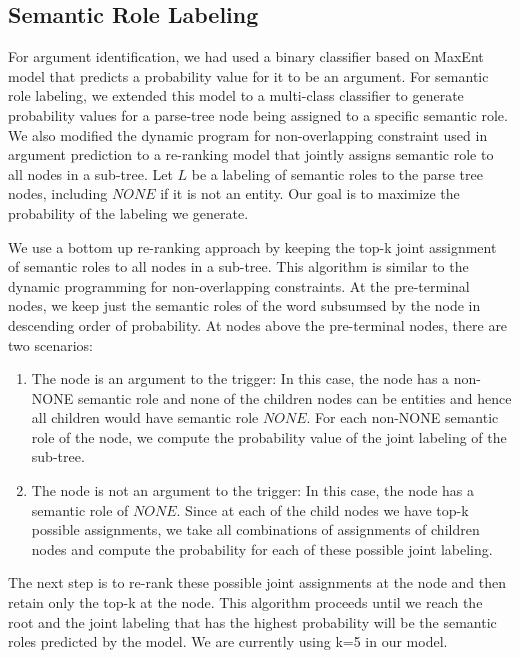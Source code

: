 \subsection{Semantic Role Labeling}
For argument identification, we had used a binary classifier based on MaxEnt model that predicts a probability value for it to be an argument. For semantic role labeling, we extended this model to a multi-class classifier to generate probability values for a parse-tree node being assigned to a specific semantic role. We also modified the dynamic program for non-overlapping constraint used in argument prediction to a re-ranking model that jointly assigns semantic role to all nodes in a sub-tree. Let $L$ be a labeling of semantic roles to the parse tree nodes, including $NONE$ if it is not an entity. Our goal is to maximize the probability of the labeling we generate.

We use a bottom up re-ranking approach by keeping the top-k joint assignment of semantic roles to all nodes in a sub-tree. This algorithm is similar to the dynamic programming for non-overlapping constraints. At the pre-terminal nodes, we keep just the semantic roles of the word subsumsed by the node in descending order of probability. At nodes above the pre-terminal nodes, there are two scenarios:

\begin{enumerate}
\item The node is an argument to the trigger: In this case, the node has a non-NONE semantic role and none of the children nodes can be entities and hence all children would have semantic role $NONE$. For each non-NONE semantic role of the node, we compute the probability value of the joint labeling of the sub-tree.
\item The node is not an argument to the trigger: In this case, the node has a semantic role of $NONE$. Since at each of the child nodes we have top-k possible assignments, we take all combinations of assignments of children nodes and compute the probability for each of these possible joint labeling.
\end{enumerate}

The next step is to re-rank these possible joint assignments at the node and then retain only the top-k at the node. This algorithm proceeds until we reach the root and the joint labeling that has the highest probability will be the semantic roles predicted by the model. We are currently using k=5 in our model.
